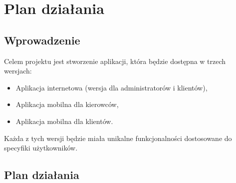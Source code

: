 \chapter{Plan działania}
\label{chap:czwarty}

\section{Wprowadzenie}
Celem projektu jest stworzenie aplikacji, która będzie dostępna w trzech wersjach:
\begin{itemize}
    \item Aplikacja internetowa (wersja dla administratorów i klientów),
    \item Aplikacja mobilna dla kierowców,
    \item Aplikacja mobilna dla klientów.
\end{itemize}

Każda z tych wersji będzie miała unikalne funkcjonalności dostosowane do specyfiki użytkowników.

\section{Plan działania}
